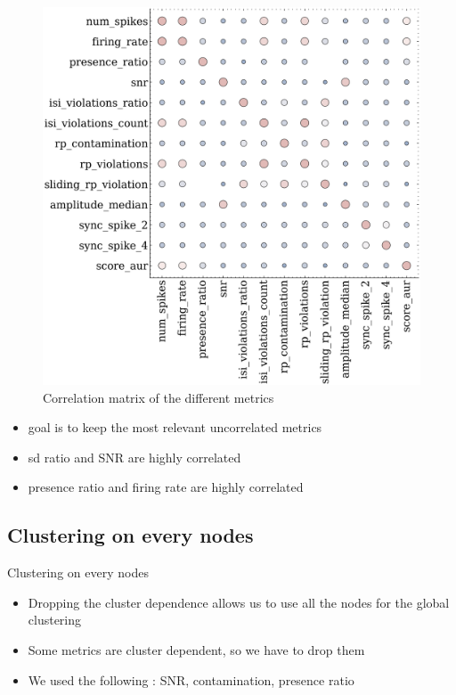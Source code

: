 \documentclass[numbering=fraction]{beamer}
\begin{document}
\begin{frame}
    \begin{minipage}{.6\textwidth}
        \begin{figure}[H]
            \centering
            \includegraphics[width=1\linewidth]{./figure/correlation.png}
            \caption{\scriptsize{Correlation matrix of the different metrics}}
            \label{}
        \end{figure}
    \end{minipage}
    \begin{minipage}{.38\textwidth}
        \begin{itemize}
            \item goal is to keep the most relevant uncorrelated metrics
            \item sd ratio and SNR are highly correlated
            \item presence ratio and firing rate are highly correlated
        \end{itemize}
    \end{minipage}
\end{frame}
\subsection{Clustering on every nodes}
\begin{frame}{Clustering on every nodes}
    \begin{itemize}
        \item Dropping the cluster dependence allows us to use all the nodes for the global clustering
        \item Some metrics are cluster dependent, so we have to drop them
        \item We used the following : SNR, contamination, presence ratio
    \end{itemize}
\end{frame}
\end{document}
